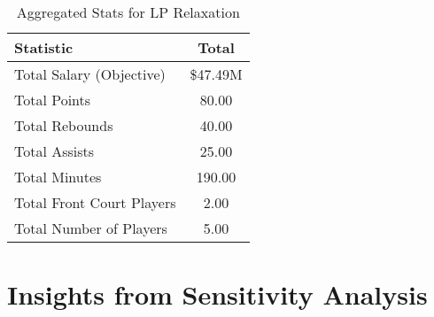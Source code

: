 \documentclass[a4paper,11pt]{article}
\begin{document}
\begin{table}[h!]
    \centering
    \renewcommand{\arraystretch}{1.2} %
    \begin{tabular}{lc}
        \hline
        \textbf{Statistic}          & \textbf{Total} \\
        \hline
        Total Salary (Objective)    & \$47.49M         \\ %
        Total Points                & 80.00          \\ %
        Total Rebounds              & 40.00          \\ %
        Total Assists               & 25.00          \\ %
        Total Minutes               & 190.00         \\ %
        Total Front Court Players   & 2.00           \\ %
        Total Number of Players     & 5.00           \\ %
        \hline
    \end{tabular}
    \caption{Aggregated Stats for LP Relaxation}
    \label{tab:team_totals_LP}
\end{table}
\section{Insights from Sensitivity Analysis}
\end{document}

